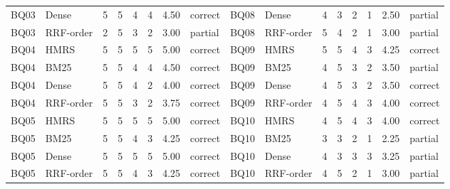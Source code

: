 \begin{table}[!t]
\begin{tabular}{@{}llrrrrrl@{\hskip 14pt}llrrrrrl@{}}
BQ03 & Dense & 5 & 5 & 4 & 4 & 4.50 & correct & BQ08 & Dense & 4 & 3 & 2 & 1 & 2.50 & partial\\
BQ03 & RRF-order & 2 & 5 & 3 & 2 & 3.00 & partial & BQ08 & RRF-order & 5 & 4 & 2 & 1 & 3.00 & partial\\
\addlinespace[1pt]
BQ04 & HMRS & 5 & 5 & 5 & 5 & 5.00 & correct & BQ09 & HMRS & 5 & 5 & 4 & 3 & 4.25 & correct\\
BQ04 & BM25 & 5 & 5 & 4 & 4 & 4.50 & correct & BQ09 & BM25 & 4 & 5 & 3 & 2 & 3.50 & partial\\
BQ04 & Dense & 5 & 5 & 4 & 2 & 4.00 & correct & BQ09 & Dense & 4 & 5 & 3 & 2 & 3.50 & correct\\
BQ04 & RRF-order & 5 & 5 & 3 & 2 & 3.75 & correct & BQ09 & RRF-order & 4 & 5 & 4 & 3 & 4.00 & correct\\
\addlinespace[1pt]
BQ05 & HMRS & 5 & 5 & 5 & 5 & 5.00 & correct & BQ10 & HMRS & 4 & 5 & 4 & 3 & 4.00 & correct\\
BQ05 & BM25 & 5 & 5 & 4 & 3 & 4.25 & correct & BQ10 & BM25 & 3 & 3 & 2 & 1 & 2.25 & partial\\
BQ05 & Dense & 5 & 5 & 5 & 5 & 5.00 & correct & BQ10 & Dense & 4 & 3 & 3 & 3 & 3.25 & partial\\
BQ05 & RRF-order & 5 & 5 & 4 & 3 & 4.25 & correct & BQ10 & RRF-order & 4 & 5 & 2 & 1 & 3.00 & partial\\
\bottomrule
\end{tabular}
\end{table}
